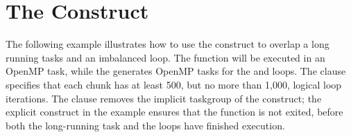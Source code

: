 \pagebreak
\chapter{The  Construct}
\label{chap:taskloop}

The following example illustrates how to use the  construct to overlap a long running tasks and an imbalanced loop.
The function  will be executed in an OpenMP task, while the  generates OpenMP tasks for the  and  loops.
The  clause specifies that each chunk has at least 500, but no more than 1,000, logical loop iterations.
The  clause removes the implicit taskgroup of the  construct; the explicit  construct in the example ensures that the function is not exited, before both the long-running task and the loops have finished execution.


